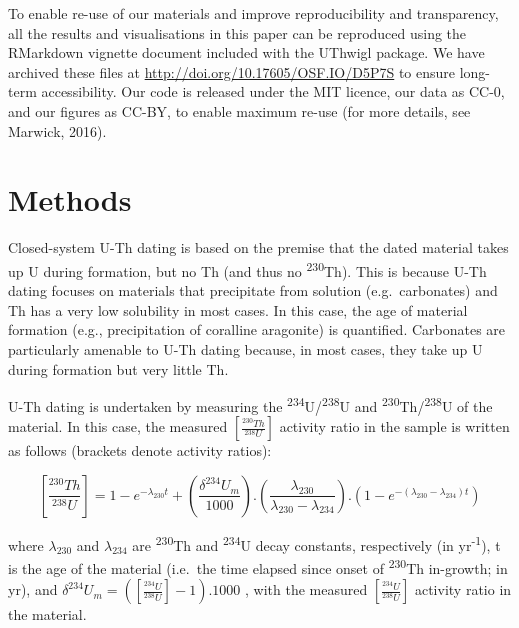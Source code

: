 \documentclass[]{elsarticle} %
\begin{document}
To enable re-use of our materials and improve reproducibility and transparency, all the results and visualisations in this paper can be reproduced using the RMarkdown vignette document included with the UThwigl package. We have archived these files at \url{http://doi.org/10.17605/OSF.IO/D5P7S} to ensure long-term accessibility. Our code is released under the MIT licence, our data as CC-0, and our figures as CC-BY, to enable maximum re-use (for more details, see Marwick, 2016).

\hypertarget{methods}{%
\section{Methods}\label{methods}}

Closed-system U-Th dating is based on the premise that the dated material takes up U during formation, but no Th (and thus no \textsuperscript{230}Th). This is because U-Th dating focuses on materials that precipitate from solution (e.g.~carbonates) and Th has a very low solubility in most cases. In this case, the age of material formation (e.g., precipitation of coralline aragonite) is quantified. Carbonates are particularly amenable to U-Th dating because, in most cases, they take up U during formation but very little Th.

U-Th dating is undertaken by measuring the \textsuperscript{234}U/\textsuperscript{238}U and \textsuperscript{230}Th/\textsuperscript{238}U of the material. In this case, the measured \([\frac{^{230}Th}{^{238}U}]\) activity ratio in the sample is written as follows (brackets denote activity ratios):

\[[\frac{^{230}Th}{^{238}U}] = 1 - e^{-\lambda_{230}t} + (\frac{\delta^{234}U_m}{1000}).(\frac{\lambda_{230}}{\lambda_{230} - \lambda_{234}}).(1 - e^{-(\lambda_{230} - \lambda_{234})t})\]

where \(\lambda_{230}\) and \(\lambda_{234}\) are \textsuperscript{230}Th and \textsuperscript{234}U decay constants, respectively (in yr\textsuperscript{-1}), t is the age of the material (i.e.~the time elapsed since onset of \textsuperscript{230}Th in-growth; in yr), and \(\delta^{234}U_m = ([\frac{^{234}U}{^{238}U}]-1).1000\) , with the measured \([\frac{^{234}U}{^{238}U}]\) activity ratio in the material.
\end{document}
